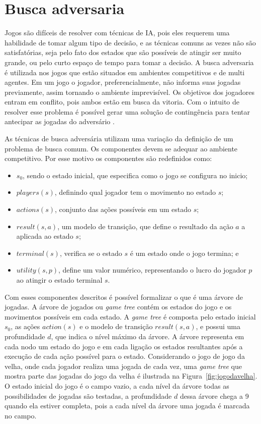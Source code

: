 \section{Busca adversaria}

Jogos são difíceis de resolver com técnicas de IA, pois eles requerem uma habilidade de tomar algum tipo de decisão, e as técnicas comuns as vezes não são satisfatórias, seja pelo fato dos estados que são possíveis de atingir ser muito grande, ou pelo curto espaço de tempo para tomar a decisão.
A busca adversaria é utilizada nos jogos que estão situados em ambientes competitivos e de multi agentes. Em um jogo o jogador, preferencialmente, não informa suas jogadas previamente, assim tornando o ambiente imprevisível. Os objetivos dos jogadores entram em conflito, pois ambos estão em busca da vitoria. 
Com o intuito de resolver esse problema é possível gerar uma solução de contingência para tentar antecipar as jogadas do adversário  \cite{intelligence2003modern}. 

As técnicas de busca adversária utilizam uma variação da definição de um problema de busca comum. Os componentes devem se adequar ao ambiente competitivo. Por esse motivo os componentes são redefinidos como:

\begin{itemize}
	\item $s_{0}$, sendo o estado inicial, que especifica como o jogo se configura no inicio;
	\item $players(s)$, definindo qual jogador tem o movimento no estado $s$;
	\item $actions(s)$, conjunto das ações possíveis em um estado $s$;
	\item $result(s, a)$, um modelo de transição, que define o resultado da ação $a$ a aplicada ao estado $s$;
	\item $terminal(s)$, verifica se o estado $s$ é um estado onde o jogo termina; e
	\item $utility(s,p)$, define um valor numérico, representando o lucro do jogador $p$ ao atingir o estado terminal $s$.
\end{itemize}

Com esses componentes descritos é possível formalizar o que é uma árvore de jogadas. A árvore de jogados ou \textit{game tree} contém os estados do jogo e os movimentos possíveis em cada estado. A \textit{game tree} é composta pelo estado inicial $s_{0}$, as ações $action(s)$ e o modelo de transição $result(s, a)$, e possui uma profundidade $d$, que indica o nível máximo da árvore. 
A árvore representa em cada nodo um estado do jogo e em cada ligação os estados resultantes após a execução de cada ação possível para o estado. Considerando o jogo de jogo da velha, onde cada jogador realiza uma jogada de cada vez, uma \textit{game tree} que mostra parte das jogadas do jogo da velha é ilustrada na Figura~\ref{fig:jogodavelha}. O estado inicial do jogo é o campo vazio, a cada nível da árvore todas as possibilidades de jogadas são testadas, a profundidade $d$ dessa árvore chega a 9 quando ela estiver completa, pois a cada nível da árvore uma jogada é marcada no campo. 

